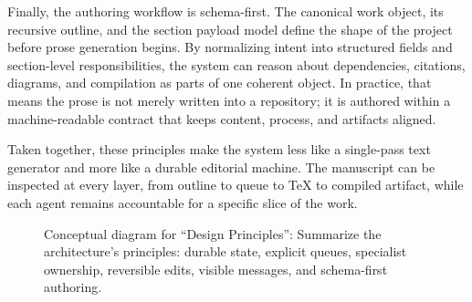 \documentclass[11pt]{article}
\begin{document}
Finally, the authoring workflow is schema-first. The canonical work object, its recursive outline, and the section payload model define the shape of the project before prose generation begins. By normalizing intent into structured fields and section-level responsibilities, the system can reason about dependencies, citations, diagrams, and compilation as parts of one coherent object. In practice, that means the prose is not merely written into a repository; it is authored within a machine-readable contract that keeps content, process, and artifacts aligned.

Taken together, these principles make the system less like a single-pass text generator and more like a durable editorial machine. The manuscript can be inspected at every layer, from outline to queue to TeX to compiled artifact, while each agent remains accountable for a specific slice of the work.

\begin{figure}[htbp]
\centering

\caption{Conceptual diagram for ``Design Principles'': Summarize the architecture's principles: durable state, explicit queues, specialist ownership, reversible edits, visible messages, and schema-first authoring.}
\end{figure}
\end{document}
